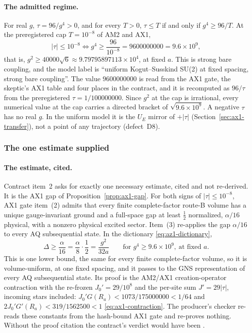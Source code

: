 \paragraph{The admitted regime.}
For real $g$, $\tau=96/g^4>0$, and for every $T>0$, $\tau\le T$ if and only
if $g^4\ge96/T$. At the preregistered cap $T=10^{-8}$ of AM2 and AX1,
\begin{equation}
 |\tau|\le10^{-8}\iff g^4\ge\frac{96}{10^{-8}}=9600000000=9.6\times10^9 ,
 \label{eq:az1-cap}
\end{equation}
that is, $g^2\ge40000\sqrt6\approx9.79795897113\times10^4$, at fixed $a$.
This is strong bare coupling, and the model label is
``uniform Kogut--Susskind SU(2) at fixed spacing, strong bare coupling''. The
value $9600000000$ is read from the AX1 gate, the skeptic's AX1 table and
four places in the contract, and it is recomputed as $96/\tau$ from the
preregistered $\tau=1/100000000$. Since $g^2$ at the cap is irrational, every
numerical value at the cap carries a directed bracket of
$\sqrt{9.6\times10^9}$. A negative $\tau$ has no real $g$. In the uniform
model it is the $U_E$ mirror of $+|\tau|$ (Section~\ref{sec:ax1-transfer}),
not a point of any trajectory (defect~D8).

\subsubsection{The one estimate supplied}
\label{sec:az1-estimate}
\paragraph{The estimate, cited.}
Contract item~2 asks for exactly one necessary estimate, cited and not
re-derived. It is the AX1 gap of Proposition~\ref{prop:ax1-gap}. For both
signs of $|\tau|\le10^{-8}$, AX1 gate item~(2) admits that every finite
complete-factor route-B volume has a unique gauge-invariant ground and a
full-space gap at least $\tfrac12$ normalized, $\alpha/16$ physical, with a
nonzero physical excited sector. Item~(3) re-applies the gap $\alpha/16$ to
every AQ subsequential state. In the dictionary \eqref{eq:az1-dictionary},
\begin{equation}
 \Delta\ge\frac\alpha{16}=\frac\alpha8\cdot\frac12=\frac{g^2}{32a}
 \qquad\text{for }g^4\ge9.6\times10^9,\ \text{at fixed }a .
 \label{eq:az1-gap}
\end{equation}
This is one lower bound, the same for every finite complete-factor volume, so
it is volume-uniform, at one fixed spacing, and it passes to the GNS
representation of every AQ subsequential state. Its proof is the AM2/AX1
creation-operator contraction with the re-frozen $J_0'=29/10^8$ and the
per-site sum $J'=29|\tau|$, incoming stars included:
$J_0'G(R_a)<1073/175000000<1/64$ and $2J_0'G'(R_a)<319/1562500<1$
\eqref{eq:ax1-contraction}. The producer's checker re-reads these constants
from the hash-bound AX1 gate and re-proves nothing. Without the proof citation
the contract's verdict would have been .

